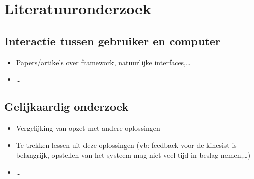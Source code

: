 \chapter{Literatuuronderzoek}

\section{Interactie tussen gebruiker en computer}

\begin{itemize}
\item Papers/artikels over framework, natuurlijke interfaces,\ldots
\item \ldots
\end{itemize}


\section{Gelijkaardig onderzoek}

\begin{itemize}
\item Vergelijking van opzet met andere oplossingen
\item Te trekken lessen uit deze oplossingen (vb: feedback voor de kinesist is belangrijk, opstellen van het systeem mag niet veel tijd in beslag nemen,\ldots)
\item \ldots
\end{itemize}